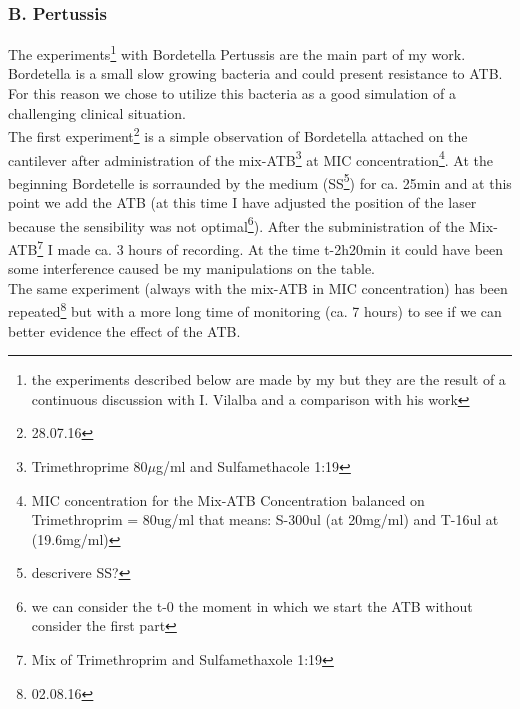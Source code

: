 \documentclass[11pt, a4paper]{article}
\begin{document}
\subsubsection{B. Pertussis}
The experiments\footnote{the experiments described below are made by my but they are the result of a continuous discussion with I. Vilalba and a comparison with his work} with Bordetella Pertussis are the main part of my work. Bordetella is a small slow growing bacteria and could present resistance to ATB. For this reason we chose to utilize this bacteria as a good simulation of a challenging clinical situation. %
\\The first experiment\footnote{28.07.16} is a simple observation of Bordetella attached on the cantilever after administration of the mix-ATB\footnote{Trimethroprime 80$\mu$g/ml and Sulfamethacole 1:19} at MIC concentration\footnote{MIC concentration for the Mix-ATB Concentration balanced on Trimethroprim = 80ug/ml that means:  S-300ul (at 20mg/ml) and T-16ul at (19.6mg/ml)}. At the beginning Bordetelle is sorraunded by the medium (SS\footnote{descrivere SS?}) for ca. 25min and at this point we add the ATB (at this time I have adjusted the position of the laser because the sensibility was not optimal\footnote{we can consider the t-0 the moment in which we start the ATB without consider the first part}). After the subministration of the Mix-ATB\footnote{Mix of Trimethroprim and Sulfamethaxole 1:19} I made ca. 3 hours of recording. At the time t-2h20min it could have been some interference caused be my manipulations on the table. \\


The same experiment  (always with the mix-ATB in MIC concentration) has been repeated\footnote{02.08.16} but with a more long time of monitoring (ca. 7 hours) to see if we can better evidence the effect of the ATB.
\end{document}
